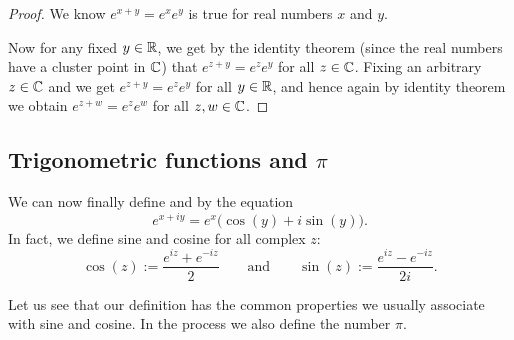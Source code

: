 \begin{proof}
We know
$e^{x+y} = e^x e^y$ is true for
real numbers $x$ and $y$.

Now for any fixed $y \in {\mathbb{R}}$, we get by the
identity theorem (since the real numbers have a cluster point in ${\mathbb{C}}$) that
$e^{z+y} = e^ze^y$ for all $z \in {\mathbb{C}}$.  Fixing an arbitrary $z \in {\mathbb{C}}$
and we get
$e^{z+y} = e^ze^y$ for all $y \in {\mathbb{R}}$, and hence again by identity theorem we obtain
$e^{z+w} = e^z e^w$
for all $z,w \in {\mathbb{C}}$.
\end{proof}

\subsection{Trigonometric functions and $\pi$}

We can now finally define \emph{} and \emph{}
by the equation
\begin{equation*}
e^{x+iy} = e^x \bigl( \cos(y) + i \sin(y) \bigr) .
\end{equation*}
In fact, we define sine and cosine for all complex $z$:
\begin{equation*}
\cos(z) := \frac{e^{iz} + e^{-iz}}{2}
\qquad\text{and}\qquad
\sin(z) := \frac{e^{iz} - e^{-iz}}{2i} .
\end{equation*}

Let us see that our definition has the common properties we usually
associate with sine and cosine.  In the process we also define the
number $\pi$.

